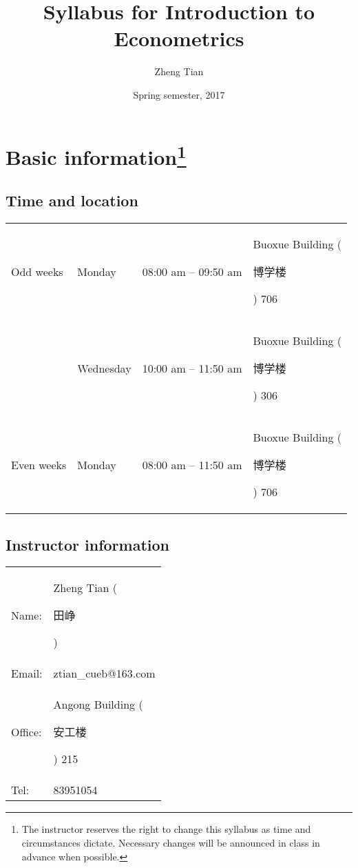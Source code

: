 \documentclass[a4paper,11pt]{article}
\author{Zheng Tian}
\date{Spring semester, 2017}
\title{Syllabus for Introduction to Econometrics}
\begin{document}
\maketitle

\section{Basic information\footnote{The instructor reserves the right to change this syllabus as
time and circumstances dictate. Necessary changes will be announced in
class in advance when possible.}}
\label{sec:org0afc9f8}
\subsection*{Time and location}
\label{sec:org78ce625}

\begin{center}
\begin{tabular}{llll}
Odd weeks & Monday & 08:00 am -- 09:50 am & Buoxue Building (\begin{CJK}{UTF8}{gbsn}博学楼\end{CJK}) 706\\
 & Wednesday & 10:00 am -- 11:50 am & Buoxue Building (\begin{CJK}{UTF8}{gbsn}博学楼\end{CJK}) 306\\
Even weeks & Monday & 08:00 am -- 11:50 am & Buoxue Building (\begin{CJK}{UTF8}{gbsn}博学楼\end{CJK}) 706\\
\end{tabular}
\end{center}


\subsection*{Instructor information}
\label{sec:org555fde7}

\begin{center}
\begin{tabular}{ll}
Name: & Zheng Tian (\begin{CJK}{UTF8}{gbsn}田峥\end{CJK})\\
Email: & ztian\_cueb@163.com\\
Office: & Angong Building (\begin{CJK}{UTF8}{gbsn}安工楼\end{CJK}) 215\\
Tel: & 83951054\\
\end{tabular}
\end{center}
\end{document}
